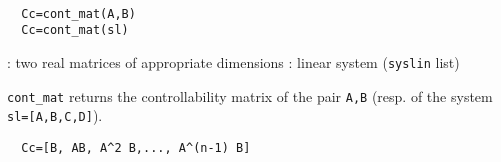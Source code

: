 \begin{mandesc}
   \\ %
\end{mandesc}
\begin{calling_sequence}
\begin{verbatim}
  Cc=cont_mat(A,B)   
  Cc=cont_mat(sl)  
\end{verbatim}
\end{calling_sequence}
\begin{parameters}
  \begin{varlist}
    : two real matrices of appropriate dimensions
    : linear system (\verb!syslin! list)
  \end{varlist}
\end{parameters}
\begin{mandescription}
  \verb!cont_mat! returns the controllability 
  matrix of the pair \verb!A,B! (resp. of the system \verb!sl=[A,B,C,D]!).
\begin{verbatim}
  Cc=[B, AB, A^2 B,..., A^(n-1) B]  
\end{verbatim}
\end{mandescription}
\begin{manseealso}
       
\end{manseealso}
